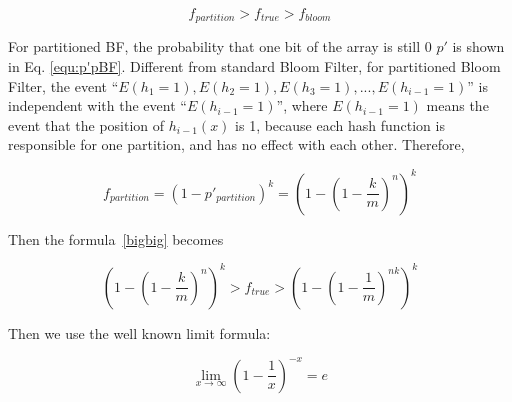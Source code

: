 

\begin{equation}
\label{bigbig}
f_{partition} > f_{true} > f_{bloom}
\end{equation}



For partitioned BF, the probability that one bit of the array is still 0 $p'$ is shown in Eq. \ref{equ:p'pBF}.
Different from standard Bloom Filter, for partitioned Bloom Filter, the event ``$E(h_1=1),E(h_2=1),E(h_3=1),...,E(h_{i-1}=1)$'' is independent with the event ``$E(h_{i-1}=1)$'', where $E(h_{i-1}=1)$ means the event that the position of $h_{i-1}(x)$ is 1, because each hash function is responsible for one partition, and has no effect with each other. Therefore, 

\begin{equation}
f_{partition}=(1-p'_{partition})^k=\left( 1- \left( 1-\dfrac{k}{m} \right)^n \right) ^k
\end{equation}

Then the formula~\ref{bigbig} becomes

\begin{equation}
\left( 1- \left( 1-\dfrac{k}{m} \right)^n \right) ^k > f_{true} > \left( 1- \left( 1-\dfrac{1}{m} \right)^{nk} \right) ^k
\end{equation}

Then we use the well known limit formula:

\begin{equation}
\lim\limits_{x \to \infty} \left( 1-\dfrac{1}{x}\right) ^{-x} = e
\end{equation}



